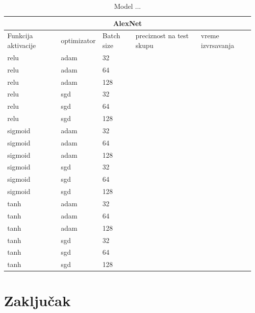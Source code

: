 \documentclass[a4paper]{article}
\begin{document}
\begin{table}[h!]
\begin{center}
\caption{Model ...}
\begin{tabular}{ |p{1.5cm}||p{2cm}|p{1cm}|p{1.5cm}|p{1cm}| }
 \hline
 \multicolumn{5}{|c|}{AlexNet} \\
 \hline
 Funkcija aktivacije & optimizator & Batch size & preciznost na test skupu & vreme izvrsavanja\\
 \hline
 relu    & adam & 32  &   &   \\
 relu    & adam & 64  &   &   \\
 relu    & adam & 128 &   &   \\
 relu    & sgd  & 32  &   &   \\
 relu    & sgd  & 64  &   &   \\
 relu    & sgd  & 128 &   &   \\
 sigmoid & adam & 32  &   &   \\
 sigmoid & adam & 64  &   &   \\
 sigmoid & adam & 128 &   &   \\
 sigmoid & sgd  & 32  &   &   \\
 sigmoid & sgd  & 64  &   &   \\
 sigmoid & sgd  & 128 &   &   \\
 tanh    & adam & 32  &   &   \\
 tanh    & adam & 64  &   &   \\
 tanh    & adam & 128 &   &   \\
 tanh    & sgd  & 32  &   &   \\
 tanh    & sgd  & 64  &   &   \\
 tanh    & sgd  & 128 &   &   \\

 \hline
\end{tabular}
\end{center}
\end{table}




\newpage

\section{Zaključak}
\label{sec:zakljucak}

\newpage

\appendix
 


\newpage

\appendix
\end{document}
